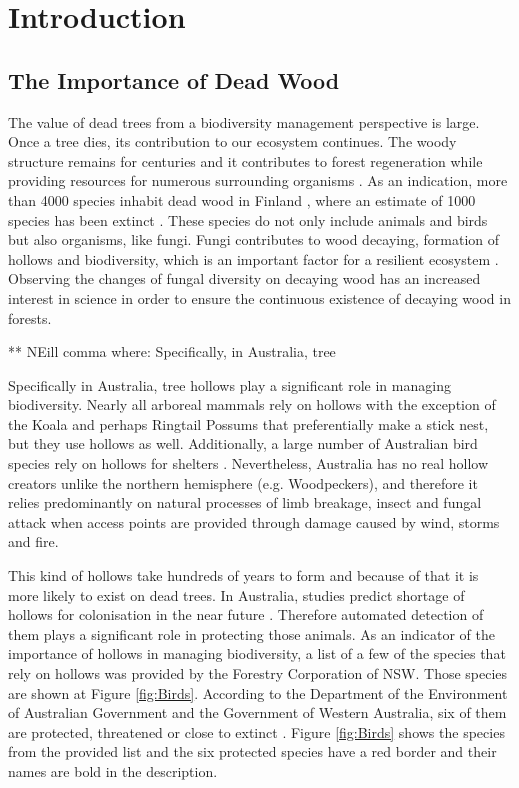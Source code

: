\documentclass{subfiles}
\begin{document}
\section{Introduction}


\subsection{The Importance of Dead Wood}

\par The value of dead trees from a biodiversity management perspective is large. Once a tree dies, its contribution to our ecosystem continues. The woody structure remains for centuries and it contributes to forest regeneration while providing resources for numerous surrounding organisms \cite{Franklin1987}. As an indication, more than 4000 species inhabit dead wood in Finland \cite{Siitonen2001}, where an estimate of 1000 species has been extinct \cite{Hanski2000}. These species do not only include animals and birds but also organisms, like fungi. Fungi contributes to wood decaying, formation of hollows and biodiversity, which is an important factor for a resilient ecosystem \cite{Peterson2000}. Observing the changes of fungal diversity on decaying wood has an increased interest in science  \cite{Abrego2011} \cite{Stokland2011} \cite{Lonsdale2008} in order to ensure the continuous existence of decaying wood in forests. 



{\color{red} ** NEill comma where: Specifically, in Australia, tree}
\par Specifically in Australia, tree hollows play a significant role in managing biodiversity. Nearly all arboreal mammals rely on hollows with the exception of the Koala and perhaps Ringtail Possums that preferentially make a stick nest, but they use hollows as well. Additionally, a large number of Australian bird species rely on hollows for shelters \cite{Gibbons2002}. Nevertheless, Australia has no real hollow creators unlike the northern hemisphere (e.g. Woodpeckers), and therefore it relies predominantly on natural processes of limb breakage, insect and fungal attack when access points are provided through damage caused by wind, storms and fire. 
\par This kind of hollows take hundreds of years to form and because of that it is more likely to exist on dead trees. In Australia, studies predict shortage of hollows for colonisation in the near future \cite{Lindenmayer2010} \cite{Goldingay2009}. Therefore automated detection of them plays a significant role in protecting those animals. As an indicator of the importance of hollows in managing biodiversity, a list of a few of the species that rely on hollows was provided by the Forestry Corporation of NSW. Those species are shown at Figure \ref{fig:Birds}. According to the Department of the Environment of Australian Government and the Government of Western Australia, six of them are  protected, threatened or close to extinct \cite{AustraliaExtinct1999}  \cite{AustraliaExtince2015}. Figure \ref{fig:Birds} shows the species from the provided list and the six protected species have a red border and their names are bold in the description. 
\end{document}
